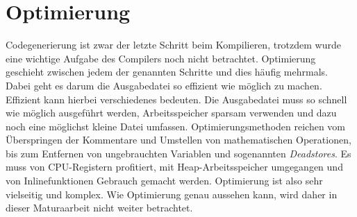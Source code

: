 \section{Optimierung}
Codegenerierung ist zwar der letzte Schritt beim Kompilieren, trotzdem wurde eine wichtige Aufgabe des Compilers noch nicht betrachtet. Optimierung geschieht zwischen jedem der genannten Schritte und dies häufig mehrmals.
Dabei geht es darum die Ausgabedatei so effizient wie möglich zu machen. Effizient kann hierbei verschiedenes bedeuten.
Die Ausgabedatei muss so schnell wie möglich ausgeführt werden, Arbeitsspeicher sparsam verwenden und dazu noch eine möglichst kleine Datei umfassen. 
Optimierungsmethoden reichen vom Überspringen der Kommentare und Umstellen von mathematischen Operationen, bis zum Entfernen von ungebrauchten Variablen und sogenannten \textit{Deadstores}.
Es muss von CPU-Registern profitiert, mit Heap-Arbeitsspeicher umgegangen und von Inlinefunktionen Gebrauch gemacht werden. %
Optimierung ist also sehr vielseitig und komplex.
Wie Optimierung genau aussehen kann, wird daher in dieser Maturaarbeit nicht weiter betrachtet.
